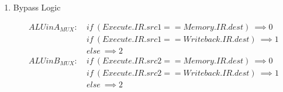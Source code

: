 \documentclass[12pt]{article}
\newenvironment{QandA}{\begin{enumerate}[label=\bfseries\alph*.]\bfseries}
                      {\end{enumerate}}
\newenvironment{answered}{\par\quad\normalfont}{}
\begin{document}
\begin{QandA}
    \item Bypass Logic
    \begin{answered}
        \begin{equation*}
        \begin{split}
        ALUinA_{MUX} : &\ if\ (Execute.IR.src1 == Memory.IR.dest)\ \implies 0\\ &\ if\ (Execute.IR.src1 == Writeback.IR.dest)\ \implies 1\\ &\ else\ \implies 2
        \end{split}
        \end{equation*}
        \begin{equation*}
        \begin{split}
        ALUinB_{MUX} : &\ if\ (Execute.IR.src2 == Memory.IR.dest)\ \implies 0\\ &\ if\ (Execute.IR.src2 == Writeback.IR.dest)\ \implies 1\\ &\ else\ \implies 2
        \end{split}
        \end{equation*}        
    \end{answered}


\end{QandA}
\end{document}

